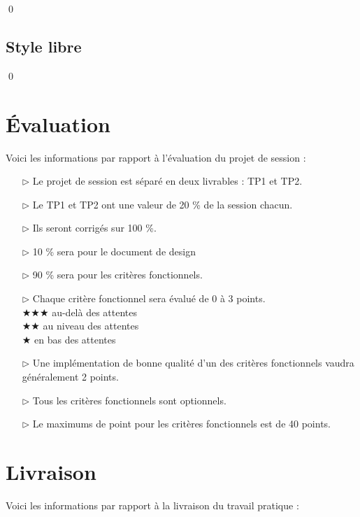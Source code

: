 \documentclass[12pt]{article}
\newcommand{\state}{\noindent}
\begin{document}
\qed

\subsection{Style libre}

\state

\qed

\pagebreak

\section*{Évaluation}

\state
Voici les informations par rapport à l'évaluation du projet de session :

\begin{itemize}
\item[$\triangleright$] Le projet de session est séparé en deux livrables : TP1 et TP2.
\item[$\triangleright$] Le TP1 et TP2 ont une valeur de 20 \% de la session chacun.
\item[$\triangleright$] Ils seront corrigés sur 100 \%.
\item[$\triangleright$] 10 \% sera pour le document de design
\item[$\triangleright$] 90 \% sera pour les critères fonctionnels.
\item[$\triangleright$] Chaque critère fonctionnel sera évalué de 0 à 3 points. \\
$\bigstar\bigstar\bigstar$ au-delà des attentes\\
$\bigstar\bigstar$ au niveau des attentes\\
$\bigstar$ en bas des attentes
\item[$\triangleright$] Une implémentation de bonne qualité d'un des critères fonctionnels vaudra généralement 2 points.
\item[$\triangleright$] Tous les critères fonctionnels sont optionnels.
\item[$\triangleright$] Le maximums de point pour les critères fonctionnels est de 40 points. \\
\end{itemize}

\pagebreak

\section*{Livraison}

\state
Voici les informations par rapport à la livraison du travail pratique :
\end{document}
